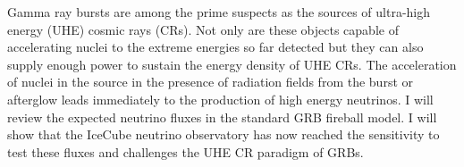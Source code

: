 


\bigskip



\bigskip

\noindent Gamma ray bursts are among the prime suspects as the sources of ultra-high energy (UHE) cosmic rays (CRs). Not only are these objects capable of accelerating nuclei to the extreme energies so far detected but they can also supply enough power to sustain the energy density of UHE CRs. The acceleration of nuclei in the source in the presence of radiation fields from the burst or afterglow leads immediately to the production of high energy neutrinos. I will review the expected neutrino fluxes in the standard GRB fireball model. I will show that the IceCube neutrino observatory has now reached the sensitivity to test these fluxes and challenges the UHE CR paradigm of GRBs.
